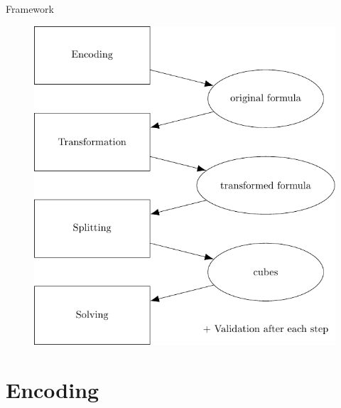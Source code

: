 \documentclass[c,8pt,xcolor...,x11names,usenames,dvipsnames]{beamer}
\begin{document}
\begin{frame}{Framework}
	\begin{figure}
		\includegraphics[scale=0.65]{images/framework}
	\end{figure}
\end{frame}

\section{Encoding}
\end{document}
